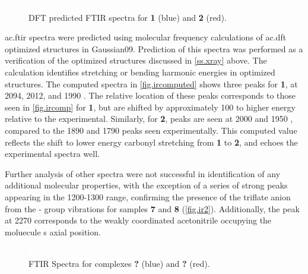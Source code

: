 \begin{figure}[!htb]
 \centering
 \includegraphics[clip=true]{images/insertgraphic.eps}
 \caption[DFT predicted FTIR spectra for \textbf{1} and \textbf{2}]{DFT predicted FTIR spectra for \textbf{1} (blue) and \textbf{2} (red).}
 \label{fig.ircomp}
\end{figure}

\Gls{ac.ftir} spectra were predicted using molecular frequency calculations of \gls{ac.dft} optimized structures in Gaussian09. Prediction of this spectra was performed as a verification of the optimized structures discussed in \autoref{ss.xray} above. The calculation identifies stretching or bending harmonic energies in optimized structures. The computed spectra in \autoref{fig.ircomputed} shows three peaks for \textbf{1}, at 2094, 2012, and 1990 . The relative location of these peaks corresponds to those seen in \autoref{fig.ircomp} for \textbf{1}, but are shifted by approximately 100  to higher energy relative to the experimental. Similarly, for \textbf{2}, peaks are seen at 2000 and 1950 , compared to the 1890 and 1790 peaks seen experimentally. This computed value reflects the shift to lower energy carbonyl stretching from \textbf{1} to \textbf{2}, and echoes the experimental spectra well.

Further analysis of other spectra were not successful in identification of any additional molecular properties, with the exception of a series of strong peaks appearing in the 1200-1300  range, confirming the presence of the triflate anion from the - group vibrations for samples \textbf{7} and \textbf{8} (\autoref{fig.ir2}). Additionally, the peak at 2270  corresponds to the weakly coordinated acetonitrile occupying the moluecule
s axial position.

\begin{figure}[!htb]
 \centering
 \includegraphics[clip=true]{images/insertgraphic.eps}
 \caption[FTIR Spectra for complexes \textbf{7} and \textbf{8}]{FTIR Spectra for complexes \textbf{?} (blue) and \textbf{?} (red).}
 \label{fig.ir2}
\end{figure}

